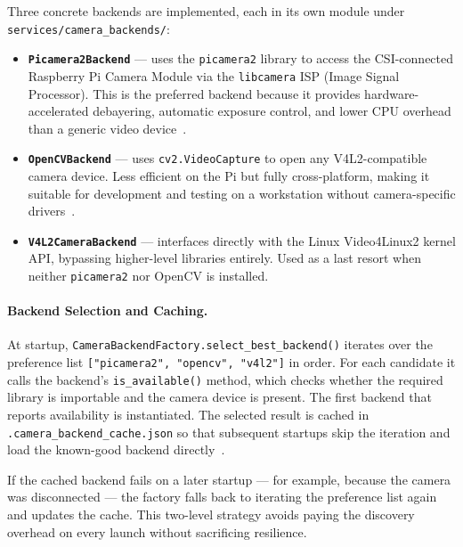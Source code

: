 Three concrete backends are implemented, each in its own module under
\texttt{services/camera\_backends/}:
 
\begin{itemize}
    \item \textbf{\texttt{Picamera2Backend}} — uses the
          \texttt{picamera2} library to access the CSI-connected
          Raspberry Pi Camera Module via the \texttt{libcamera} ISP
          (Image Signal Processor). This is the preferred backend
          because it provides hardware-accelerated debayering,
          automatic exposure control, and lower CPU overhead than
          a generic video device~\cite{picamera2023}.
 
    \item \textbf{\texttt{OpenCVBackend}} — uses
          \texttt{cv2.VideoCapture} to open any V4L2-compatible
          camera device. Less efficient on the Pi but fully
          cross-platform, making it suitable for development and
          testing on a workstation without camera-specific
          drivers~\cite{bradski2000opencv}.
 
    \item \textbf{\texttt{V4L2CameraBackend}} — interfaces directly
          with the Linux Video4Linux2 kernel API, bypassing
          higher-level libraries entirely. Used as a last resort when
          neither \texttt{picamera2} nor OpenCV is installed.
\end{itemize}
 
\paragraph{Backend Selection and Caching.}
 
At startup, \texttt{CameraBackendFactory.select\_best\_backend()}
iterates over the preference list \texttt{["picamera2", "opencv",
"v4l2"]} in order. For each candidate it calls the backend's
\texttt{is\_available()} method, which checks whether the required
library is importable and the camera device is present. The first
backend that reports availability is instantiated. The selected result
is cached in \texttt{.camera\_backend\_cache.json} so that subsequent
startups skip the iteration and load the known-good backend
directly~\cite{gamma1994design}.
 
If the cached backend fails on a later startup — for example, because
the camera was disconnected — the factory falls back to iterating the
preference list again and updates the cache. This two-level strategy
avoids paying the discovery overhead on every launch without
sacrificing resilience.
 
